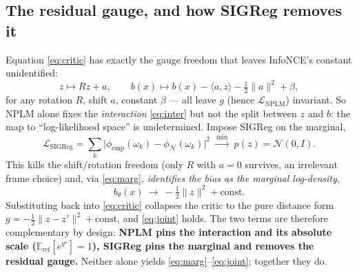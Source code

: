 \documentclass[11pt]{article}
\begin{document}
\subsection{The residual gauge, and how SIGReg removes it}
Equation \eqref{eq:critic} has exactly the gauge freedom that leaves InfoNCE's
constant unidentified:
\begin{equation}
z \mapsto Rz + a,\qquad b(x)\mapsto b(x) - \langle a, z\rangle - \tfrac12\|a\|^2 + \beta,
\end{equation}
for any rotation $R$, shift $a$, constant $\beta$ --- all leave $g$ (hence
$\mathcal{L}_{\mathrm{NPLM}}$) invariant. So NPLM alone fixes the \emph{interaction}
\eqref{eq:inter} but not the split between $z$ and $b$: the map to
``log-likelihood space'' is undetermined. Impose SIGReg on the marginal,
\begin{equation}
\mathcal{L}_{\mathrm{SIGReg}}
= \sum_k\big|\phi_{\mathrm{emp}}(\omega_k)-\phi_{\mathcal{N}}(\omega_k)\big|^2
\ \xrightarrow{\ \min\ }\ p(z)=\mathcal{N}(0,I).
\end{equation}
This kills the shift/rotation freedom (only $R$ with $a=0$ survives, an irrelevant
frame choice) and, via \eqref{eq:marg}, \emph{identifies the bias as the marginal
log-density},
\begin{equation}
b_\theta(x)\ \longrightarrow\ -\tfrac12\|z\|^2 + \text{const}.
\end{equation}
Substituting back into \eqref{eq:critic} collapses the critic to the pure distance
form $g=-\tfrac12\|z-z'\|^2+\text{const}$, and \eqref{eq:joint} holds. The two
terms are therefore complementary by design: \textbf{NPLM pins the interaction and
its absolute scale ($\mathbb{E}_{\mathrm{ref}}[e^{g^\star}]=1$), SIGReg pins the
marginal and removes the residual gauge.} Neither alone yields
\eqref{eq:marg}--\eqref{eq:joint}; together they do.
\end{document}
